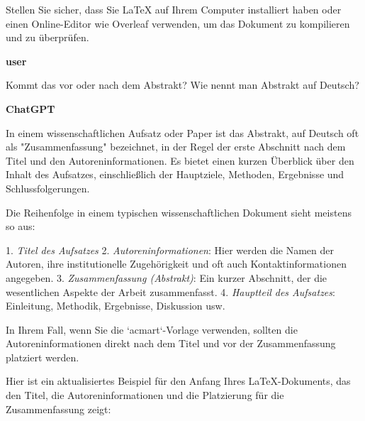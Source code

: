 Stellen Sie sicher, dass Sie LaTeX auf Ihrem Computer installiert haben oder einen Online-Editor wie Overleaf verwenden, um das Dokument zu kompilieren und zu überprüfen.

\textbf{user}

Kommt das vor oder nach dem Abstrakt? Wie nennt man Abstrakt auf Deutsch?

\textbf{ChatGPT}

In einem wissenschaftlichen Aufsatz oder Paper ist das Abstrakt, auf Deutsch oft als "Zusammenfassung" bezeichnet, in der Regel der erste Abschnitt nach dem Titel und den Autoreninformationen. Es bietet einen kurzen Überblick über den Inhalt des Aufsatzes, einschließlich der Hauptziele, Methoden, Ergebnisse und Schlussfolgerungen.

Die Reihenfolge in einem typischen wissenschaftlichen Dokument sieht meistens so aus:

1. \textit{Titel des Aufsatzes}
2. \textit{Autoreninformationen}: Hier werden die Namen der Autoren, ihre institutionelle Zugehörigkeit und oft auch Kontaktinformationen angegeben.
3. \textit{Zusammenfassung (Abstrakt)}: Ein kurzer Abschnitt, der die wesentlichen Aspekte der Arbeit zusammenfasst.
4. \textit{Hauptteil des Aufsatzes}: Einleitung, Methodik, Ergebnisse, Diskussion usw.

In Ihrem Fall, wenn Sie die `acmart`-Vorlage verwenden, sollten die Autoreninformationen direkt nach dem Titel und vor der Zusammenfassung platziert werden. 

Hier ist ein aktualisiertes Beispiel für den Anfang Ihres LaTeX-Dokuments, das den Titel, die Autoreninformationen und die Platzierung für die Zusammenfassung zeigt:

